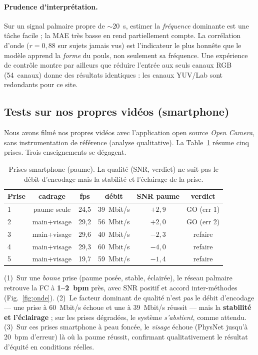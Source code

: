 \documentclass[11pt]{article}
\begin{document}
\paragraph{Prudence d'interprétation.} Sur un signal palmaire propre de $\sim$20~s,
estimer la \emph{fréquence} dominante est une tâche \og{}facile\fg{} ; la MAE très basse en
rend partiellement compte. La corrélation d'onde ($r=0{,}88$ sur sujets jamais vus)
est l'indicateur le plus honnête que le modèle apprend la \emph{forme} du pouls, non
seulement sa fréquence. Une expérience de contrôle montre par ailleurs que réduire
l'entrée aux seuls canaux RGB (54~canaux) donne des résultats identiques : les canaux
YUV/Lab sont redondants pour ce site.

\subsection{Tests sur nos propres vidéos (smartphone)}
\label{sec:perso}
Nous avons filmé nos propres vidéos avec l'application open source \emph{Open Camera},
sans instrumentation de référence (analyse qualitative). La Table~\ref{tab:phone}
résume cinq prises. Trois enseignements se dégagent.

\begin{table}[h]
\centering
\caption{Prises smartphone (paume). La qualité (SNR, verdict) ne suit pas le débit
d'encodage mais la stabilité et l'éclairage de la prise.}
\label{tab:phone}
\begin{tabular}{lccccc}
\toprule
Prise & cadrage & fps & débit & SNR paume & verdict \\
\midrule
1 & paume seule    & 24{,}5 & 39~Mbit/s & $+2{,}9$ & GO (err 1) \\
2 & main+visage    & 29{,}2 & 56~Mbit/s & $+2{,}0$ & GO (err 2) \\
3 & main+visage    & 29{,}6 & 40~Mbit/s & $-2{,}3$ & refaire \\
4 & main+visage    & 29{,}3 & 60~Mbit/s & $-4{,}0$ & refaire \\
5 & main+visage    & 19{,}7 & 59~Mbit/s & $-1{,}4$ & refaire \\
\bottomrule
\end{tabular}
\end{table}

(1)~Sur une \emph{bonne} prise (paume posée, stable, éclairée), le réseau palmaire
retrouve la FC à \textbf{1--2~bpm} près, avec SNR positif et accord inter-méthodes
(Fig.~\ref{fig:onde}). (2)~Le facteur dominant de qualité n'est \emph{pas} le débit
d'encodage --- une prise à 60~Mbit/s échoue et une à 39~Mbit/s réussit --- mais la
\textbf{stabilité et l'éclairage} ; sur les prises dégradées, le système
\emph{s'abstient}, comme attendu. (3)~Sur ces prises smartphone à peau foncée, le
\emph{visage} échoue (PhysNet jusqu'à 20~bpm d'erreur) là où la paume réussit,
confirmant qualitativement le résultat d'équité en conditions réelles.
\end{document}
